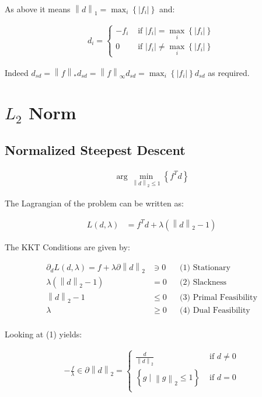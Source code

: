 \documentclass[]{article}
\newcommand{\MyParen}[1]{\left( #1 \right)}
\newcommand{\MyBrace}[1]{\left\lbrace #1 \right\rbrace}
\newcommand{\MyNorm}[2]{{\left\| #1 \right\|}_{#2}}
\newcommand{\MyAbs}[1]{\left| #1 \right|}
\newcommand{\MyNormTwo}[1]{\MyNorm{#1}{2}}
\begin{document}
	As above it means $ \MyNorm{d}{1} = \max_{i} \MyBrace{ \MyAbs{ {f}_{i} } } $ and:
	
	\begin{align*}
	{d}_{i} = \begin{cases} -{f}_{i} & \text{ if } \MyAbs{ {f}_{i} } = \max_{i} \MyBrace{ \MyAbs{ {f}_{i} } } \\ 0 & \text{ if } \MyAbs{ {f}_{i} } \neq \max_{i} \MyBrace{ \MyAbs{ {f}_{i} } } \end{cases}
	\end{align*}
	
	Indeed $ {d}_{sd} = \MyNorm{f}{\ast} {d}_{sd} = \MyNorm{f}{\infty} {d}_{sd} = \max_{i} \MyBrace{ \MyAbs{ {f}_{i} } } {d}_{sd} $ as required.
	
	\section{$ {L}_{2} $ Norm}
	
	\subsection{Normalized Steepest Descent}
	
	\begin{align*}
	\arg \min_{ \MyNorm{d}{2} \leq 1 } \MyBrace{ {f}^{T} d }
	\end{align*}
	
	The Lagrangian of the problem can be written as:
	
	\begin{align*}
	L \MyParen{d, \lambda} & = {f}^{T} d + \lambda \MyParen{ \MyNormTwo{d} - 1 }
	\end{align*}
	
	The KKT Conditions are given by:
	
	\begin{align*}
	{\partial}_{d} L \MyParen{ d, \lambda } = f + \lambda \partial \MyNorm{d}{2} & \ni 0 && \text{(1) Stationary} \\
	\lambda \MyParen{ \MyNorm{d}{2}  - 1 } 	& = 0 		&& \text{(2) Slackness} \\
	\MyNorm{d}{2} - 1						& \leq 0 	&& \text{(3) Primal Feasibility} \\
	\lambda 							& \geq 0 	&& \text{(4) Dual Feasibility} \\
	\end{align*}
	
	Looking at (1) yields:
	
	\begin{align*}
	- \frac{f}{\lambda} \in \partial \MyNorm{d}{2} = \begin{cases} \frac{d}{ \MyNormTwo{d} } & \text{ if } d \neq 0 \\ \MyBrace{ g \mid \MyNormTwo{g} \leq 1 } & \text{ if } d = 0 \\ \end{cases}
	\end{align*}
	
\end{document}
